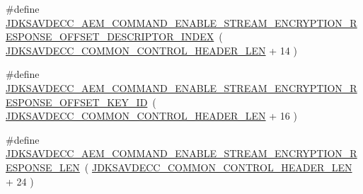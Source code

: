 \begin{DoxyCompactItemize}
\item 
\#define \hyperlink{group__command__enable__stream__encryption__response_gae059f03d3ab54a7312dc7c2166bdd147}{J\+D\+K\+S\+A\+V\+D\+E\+C\+C\+\_\+\+A\+E\+M\+\_\+\+C\+O\+M\+M\+A\+N\+D\+\_\+\+E\+N\+A\+B\+L\+E\+\_\+\+S\+T\+R\+E\+A\+M\+\_\+\+E\+N\+C\+R\+Y\+P\+T\+I\+O\+N\+\_\+\+R\+E\+S\+P\+O\+N\+S\+E\+\_\+\+O\+F\+F\+S\+E\+T\+\_\+\+D\+E\+S\+C\+R\+I\+P\+T\+O\+R\+\_\+\+I\+N\+D\+EX}~( \hyperlink{group__jdksavdecc__avtp__common__control__header_gaae84052886fb1bb42f3bc5f85b741dff}{J\+D\+K\+S\+A\+V\+D\+E\+C\+C\+\_\+\+C\+O\+M\+M\+O\+N\+\_\+\+C\+O\+N\+T\+R\+O\+L\+\_\+\+H\+E\+A\+D\+E\+R\+\_\+\+L\+EN} + 14 )
\item 
\#define \hyperlink{group__command__enable__stream__encryption__response_ga20c61800f3b1b54dd374eec3771252f9}{J\+D\+K\+S\+A\+V\+D\+E\+C\+C\+\_\+\+A\+E\+M\+\_\+\+C\+O\+M\+M\+A\+N\+D\+\_\+\+E\+N\+A\+B\+L\+E\+\_\+\+S\+T\+R\+E\+A\+M\+\_\+\+E\+N\+C\+R\+Y\+P\+T\+I\+O\+N\+\_\+\+R\+E\+S\+P\+O\+N\+S\+E\+\_\+\+O\+F\+F\+S\+E\+T\+\_\+\+K\+E\+Y\+\_\+\+ID}~( \hyperlink{group__jdksavdecc__avtp__common__control__header_gaae84052886fb1bb42f3bc5f85b741dff}{J\+D\+K\+S\+A\+V\+D\+E\+C\+C\+\_\+\+C\+O\+M\+M\+O\+N\+\_\+\+C\+O\+N\+T\+R\+O\+L\+\_\+\+H\+E\+A\+D\+E\+R\+\_\+\+L\+EN} + 16 )
\item 
\#define \hyperlink{group__command__enable__stream__encryption__response_gae8d51bb197e358eca01f5dd9ba3c3d77}{J\+D\+K\+S\+A\+V\+D\+E\+C\+C\+\_\+\+A\+E\+M\+\_\+\+C\+O\+M\+M\+A\+N\+D\+\_\+\+E\+N\+A\+B\+L\+E\+\_\+\+S\+T\+R\+E\+A\+M\+\_\+\+E\+N\+C\+R\+Y\+P\+T\+I\+O\+N\+\_\+\+R\+E\+S\+P\+O\+N\+S\+E\+\_\+\+L\+EN}~( \hyperlink{group__jdksavdecc__avtp__common__control__header_gaae84052886fb1bb42f3bc5f85b741dff}{J\+D\+K\+S\+A\+V\+D\+E\+C\+C\+\_\+\+C\+O\+M\+M\+O\+N\+\_\+\+C\+O\+N\+T\+R\+O\+L\+\_\+\+H\+E\+A\+D\+E\+R\+\_\+\+L\+EN} + 24 )
\end{DoxyCompactItemize}
